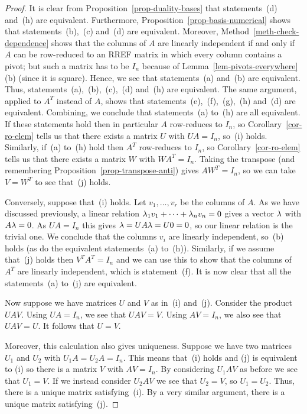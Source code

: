 \documentclass[reqno]{amsart}
\theoremstyle{definition}
\begin{document}
\begin{proof}
 It is clear from Proposition~\ref{prop-duality-bases}
 that statements~(d) and~(h) are equivalent.
 Furthermore, Proposition~\ref{prop-basis-numerical} shows
 that statements~(b),~(c) and~(d) are equivalent.
 Moreover, Method~\ref{meth-check-dependence} shows that
 the columns of $A$ are linearly independent if and only if
 $A$ can be row-reduced to an RREF matrix in which every
 column contains a pivot; but such a matrix has to be $I_n$
 because of Lemma~\ref{lem-pivots-everywhere} (b)
 (since it is square).
 Hence, we see that statements~(a) and~(b) are equivalent.
 Thus, statements~(a),~(b),~(c),~(d) and~(h) are equivalent.
 The same argument, applied to $A^T$ instead of $A$, shows
 that statements~(e),~(f),~(g),~(h) and~(d) are equivalent.
 Combining, we conclude that statements~(a) to~(h) are all
 equivalent.  If these statements hold then in particular $A$
 row-reduces to $I_n$, so Corollary~\ref{cor-ro-elem} tells us that
 there exists a matrix $U$ with $UA=I_n$, so~(i) holds.  Similarly,
 if~(a) to~(h) hold then $A^T$ row-reduces to $I_n$, so
 Corollary~\ref{cor-ro-elem} tells us that there exists a matrix $W$
 with $WA^T=I_n$.  Taking the transpose (and remembering
 Proposition~\ref{prop-transpose-anti}) gives $AW^T=I_n$, so we can
 take $V=W^T$ to see that~(j) holds.

 Conversely, suppose that~(i) holds.  Let $v_1,\dotsc,v_r$ be the
 columns of $A$.  As we have discussed previously, a linear relation
 $\lambda_1v_1+\dotsb+\lambda_nv_n=0$ gives a vector $\lambda$ with $A\lambda=0$.
 As $UA=I_n$ this gives $\lambda=UA\lambda=U0=0$, so our linear relation is
 the trivial one.  We conclude that the columns $v_i$ are linearly
 independent, so~(b) holds (as do the equivalent statements~(a)
 to~(h)).  Similarly, if we assume that~(j) holds then $V^TA^T=I_n$
 and we can use this to show that the columns of $A^T$ are linearly
 independent, which is statement~(f).  It is now clear that all the
 statements~(a) to~(j) are equivalent.

 Now suppose we have matrices $U$ and $V$ as in~(i) and~(j).  Consider
 the product $UAV$.  Using $UA=I_n$, we see that $UAV=V$.  Using
 $AV=I_n$, we also see that $UAV=U$.  It follows that $U=V$.

 Moreover, this calculation also gives uniqueness.  Suppose we have
 two matrices $U_1$ and $U_2$ with $U_1A=U_2A=I_n$.  This means
 that~(i) holds and (j) is equivalent to (i) so there is a matrix $V$
 with $AV=I_n$.  By considering $U_1AV$ as before we see that
 $U_1=V$.  If we instead consider $U_2AV$ we see that $U_2=V$, so
 $U_1=U_2$.  Thus, there is a unique matrix satisfying~(i).  By a very
 similar argument, there is a unique matrix satisfying~(j).
\end{proof}
\end{document}
